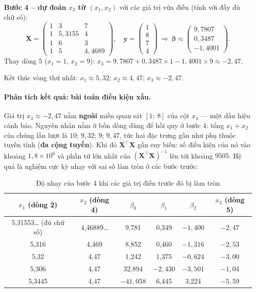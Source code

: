 \noindent\textbf{Bước 4 -- dự đoán $x_3$ từ $(x_1, x_2)$} với các giá trị vừa điền (tính với đầy đủ chữ số):
\[
    \mathbf{X} = \begin{pmatrix} 1 & 3 & 7 \\ 1 & 5{,}3155 & 4 \\ 1 & 6 & 3 \\ 1 & 5 & 4{,}4689 \end{pmatrix}, \quad
    \mathbf{y} = \begin{pmatrix} 1 \\ 8 \\ 7 \\ 4 \end{pmatrix}
    \ \Rightarrow\
    \boldsymbol{\beta} \approx \begin{pmatrix} 9{,}7807 \\ 0{,}3487 \\ -1{,}4001 \end{pmatrix}.
\]
Thay dòng 5 ($x_1 = 1$, $x_2 = 9$): $x_3 = 9{,}7807 + 0{,}3487 \times 1 - 1{,}4001 \times 9 \approx -2{,}47$.

Kết thúc vòng thứ nhất: $x_1 \approx 5{,}32$; $x_2 \approx 4{,}47$; $x_3 \approx -2{,}47$.

\paragraph{Phân tích kết quả: bài toán điều kiện xấu.} Giá trị $x_3 \approx -2{,}47$ nằm \textbf{ngoài} miền quan sát $[1;\ 8]$ của cột $x_3$ --- một dấu hiệu cảnh báo. Nguyên nhân nằm ở bốn dòng dùng để hồi quy ở bước 4: tổng $x_1 + x_2$ của chúng lần lượt là $10$; $9{,}32$; $9$; $9{,}47$, tức hai đặc trưng gần như phụ thuộc tuyến tính (\textbf{đa cộng tuyến}). Khi đó $\mathbf{X}^\top\mathbf{X}$ gần suy biến: số điều kiện của nó vào khoảng $1{,}8 \times 10^6$ và phần tử lớn nhất của $(\mathbf{X}^\top\mathbf{X})^{-1}$ lên tới khoảng $9505$. Hệ quả là nghiệm cực kỳ nhạy với sai số làm tròn ở các bước trước:

\begin{table}[H]
\centering
\begin{tabular}{|c|c|c|c|c|c|}
\hline
\textbf{$x_1$ (dòng 2)} & \textbf{$x_2$ (dòng 4)} & $\beta_0$ & $\beta_1$ & $\beta_2$ & \textbf{$x_3$ (dòng 5)} \\
\hline
5,31553\ldots{} (đủ chữ số) & 4,46889\ldots & 9,781 & 0,349 & $-1{,}400$ & $-2{,}47$ \\ \hline
5,316 & 4,469 & 8,852 & 0,460 & $-1{,}316$ & $-2{,}53$ \\ \hline
5,32 & 4,47 & 1,242 & 1,375 & $-0{,}624$ & $-3{,}00$ \\ \hline
5,306 & 4,47 & 32,894 & $-2{,}430$ & $-3{,}501$ & $-1{,}04$ \\ \hline
5,3445 & 4,47 & $-41{,}058$ & 6,445 & 3,224 & $-5{,}59$ \\ \hline
\end{tabular}
\caption{Độ nhạy của bước 4 khi các giá trị điền trước đó bị làm tròn}
\label{tab:iter-sensitivity}
\end{table}

